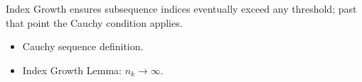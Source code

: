 \begin{remark*}
Index Growth ensures subsequence indices eventually exceed any threshold; past that point the Cauchy condition applies.
\end{remark*}

\begin{remark*}[Dependencies]
\begin{itemize}
  \item Cauchy sequence definition.
  \item Index Growth Lemma: $n_k \to \infty$.
\end{itemize}
\end{remark*}
